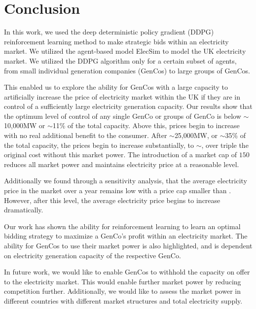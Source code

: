 \documentclass[conference]{IEEEtran}
\begin{document}

\section{Conclusion}
\label{sec:conclusion}

In this work, we used the deep deterministic policy gradient (DDPG) reinforcement learning method to make strategic bids within an electricity market. We utilized the agent-based model ElecSim to model the UK electricity market. We utilized the DDPG algorithm only for a certain subset of agents, from small individual generation companies (GenCos) to large groups of GenCos. 

This enabled us to explore the ability for GenCos with a large capacity to artificially increase the price of electricity market within the UK if they are in control of a sufficiently large electricity generation capacity. Our results show that the optimum level of control of any single GenCo or groups of GenCo is below ${\sim}$10,000MW or ${\sim}$11\% of the total capacity. Above this, prices begin to increase with no real additional benefit to the consumer. After ${\sim}$25,000MW, or ${\sim}$35\% of the total capacity, the prices begin to increase substantially, to ${\sim}$, over triple the original cost without this market power. The introduction of a market cap of \textsterling$150$ reduces all market power and maintains electricity price at a reasonable level.

Additionally we found through a sensitivity analysis, that the average electricity price in the market over a year remains low with a price cap smaller than . However, after this level, the average electricity price begins to increase dramatically.


Our work has shown the ability for reinforcement learning to learn an optimal bidding strategy to maximize a GenCo's profit within an electricity market. The ability for GenCos to use their market power is also highlighted, and is dependent on electricity generation capacity of the respective GenCo.

In future work, we would like to enable GenCos to withhold the capacity on offer to the electricity market. This would enable further market power by reducing competition further.  Additionally, we would like to assess the market power in different countries with different market structures and total electricity supply.
\end{document}
